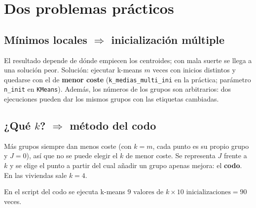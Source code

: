 \documentclass[a4paper,11pt]{article}
\begin{document}
\section{Dos problemas prácticos}

\subsection*{Mínimos locales $\Rightarrow$ inicialización múltiple}
El resultado depende de dónde empiecen los centroides; con mala suerte se llega a una solución peor.
Solución: ejecutar k-means $m$ veces con inicios distintos y quedarse con el de \textbf{menor coste}
(\texttt{k\_medias\_multi\_ini} en la práctica; parámetro \texttt{n\_init} en \texttt{KMeans}).
Además, los números de los grupos son arbitrarios: dos ejecuciones pueden dar los mismos grupos con las etiquetas cambiadas.

\subsection*{¿Qué $k$? $\Rightarrow$ método del codo}
\begin{minipage}[c]{0.52\linewidth}\raggedright
Más grupos siempre dan menos coste (con $k=m$, cada punto es su propio grupo y $J=0$), así que no se puede elegir el $k$
de menor coste. Se representa $J$ frente a $k$ y se elige el punto a partir del cual añadir un grupo apenas mejora:
el \textbf{codo}. En las viviendas sale $k=4$.\par
En el script del codo se ejecuta k-means
$9 \text{ valores de } k \times 10 \text{ inicializaciones} = 90$ veces.
\end{minipage}\hfill
\begin{minipage}[c]{0.45\linewidth}
\end{minipage}
\end{document}
